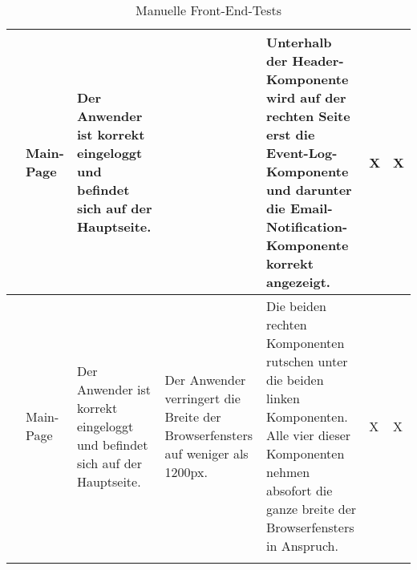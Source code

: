 \begin{longtable}{| p{} | p{} | p{} | p{} | p{} | p{} | p{} |}
	\stepcounter{TestNumber}\arabic{TestNumber} & Main-Page & Der Anwender ist korrekt eingeloggt und befindet sich auf der Hauptseite. & & Unterhalb der Header-Komponente wird auf der rechten Seite erst die Event-Log-Komponente und darunter die Email-Notification-Komponente korrekt angezeigt. & X & X \\ \hline
	
	\stepcounter{TestNumber}\arabic{TestNumber} & Main-Page & Der Anwender ist korrekt eingeloggt und befindet sich auf der Hauptseite. & Der Anwender verringert die Breite der Browserfensters auf weniger als 1200px. & Die beiden rechten Komponenten rutschen unter die beiden linken Komponenten. Alle vier dieser Komponenten nehmen absofort die ganze breite der Browserfensters in Anspruch. & X & X \\ \hline
	
	\caption{Manuelle Front-End-Tests}
	\label{tab:manuelle_front_end_tests}
\end{longtable}
